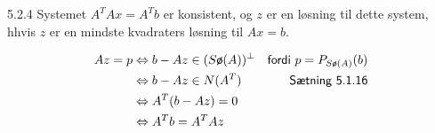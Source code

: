 \begin{proposition}{5.2.4}
	Systemet $A^T Ax = A^T b$ er konsistent, og $z$ er en løsning til dette 
	system, hhvis $z$ er en mindste kvadraters løsning til $Ax =  b$.
\end{proposition}

\begin{bevis}
	\begin{align*}
		Az = p &\Leftrightarrow b - Az \in (S\textsf{ø}(A))^\bot 
				& \textsf{fordi }p = P_{S\textsf{ø}(A)}(b) \\
			& \Leftrightarrow b - Az \in N(A^T) & \textsf{Sætning 5.1.16} \\
			& \Leftrightarrow A^T (b - Az) = 0 \\
			& \Leftrightarrow A^T b = A^T Az
	\end{align*}
\end{bevis}

